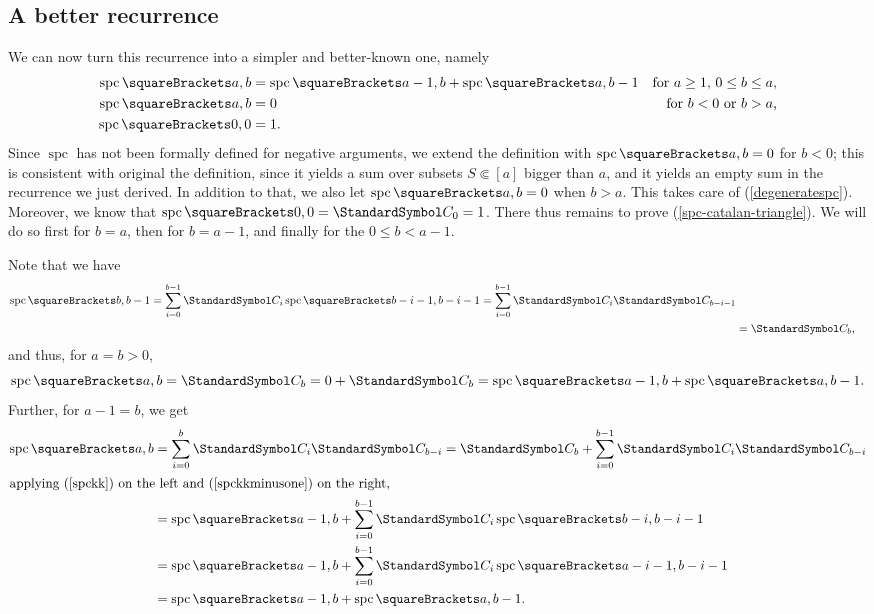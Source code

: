 \documentclass[10pt, a4paper, twoside]{basestyle}
\DeclareMathOperator{\spc}{spc}
\newcommand{\CatalanNumber}[1]{\StandardSymbol C_{#1}}
\begin{document}
\subsection{A better recurrence}
We can now turn this recurrence into a simpler and better-known one, namely
\begin{align}
\spc\of{a,b} &= \spc\of{a-1, b} + \spc\of{a,b-1} & \text{for $a\geq 1$, $0\leq b \leq a$,}\label{spc-catalan-triangle}\\
\spc\of{a,b} &= 0 & \text{for $b < 0$ or $b > a$,}\label{degeneratespc}\\
\spc\of{0,0} &= 1 \label{spc00}\text.
\end{align}
Since $\spc$ has not been formally defined for negative arguments, we extend the definition
with $\spc\of{a,b}=0$ for $b<0$; this is consistent with original the definition, since it yields a sum over
subsets $S\Subset [a]$ bigger than $a$, and it yields an empty sum in the recurrence we just derived.
In addition to that, we also let $\spc\of{a,b} = 0$ when $b > a$. This takes care of (\ref{degeneratespc}).
Moreover, we know that $\spc\of{0,0}=\CatalanNumber 0=1$. There thus remains to prove (\ref{spc-catalan-triangle}).
We will do so first for $b=a$, then for $b=a-1$, and finally for the $0\leq b < a-1$.

Note that we have\begin{align}
\spc\of{b, b-1}
= \sum{i=0}[b-1]\CatalanNumber {i}\spc\of{b-i-1,b-i-1} 
= \sum{i=0}[b-1]\CatalanNumber {i}\CatalanNumber {b-i-1} \nonumber \\
&= \CatalanNumber {b}\text,\label{spckkminusone}
\end{align}
and thus, for $a=b > 0$,
\begin{equation}
\spc\of{a,b} = \CatalanNumber b = 0 + \CatalanNumber b = \spc\of{a-1, b} + \spc\of{a, b-1}.
\end{equation}
Further, for $a - 1 = b$, we get
\begin{align}
\spc\of{a,b}
&= \sum{i=0}[b]\CatalanNumber {i}\CatalanNumber {b-i} =
\CatalanNumber b + \sum{i=0}[b-1]\CatalanNumber{i}\CatalanNumber {b-i} \nonumber\\
\intertext{applying (\ref{spckk}) on the left and (\ref{spckkminusone}) on the right,}
&= \spc\of{a-1, b} + \sum{i=0}[b-1]\CatalanNumber {i}\spc\of{b-i,b-i-1} \nonumber\\
&= \spc\of{a-1, b} + \sum{i=0}[b-1]\CatalanNumber {i}\spc\of{a-i-1,b-i-1} \nonumber\\
&= \spc\of{a-1, b} + \spc\of{a,b-1}\text.
\end{align}
\end{document}
